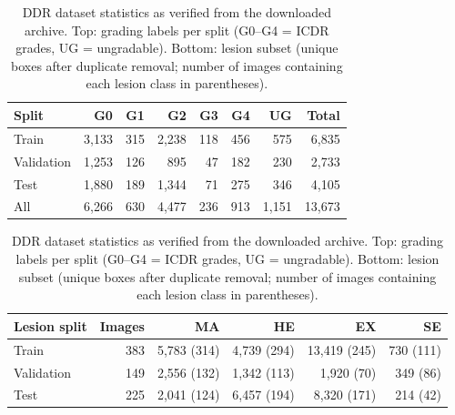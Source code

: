 \begin{table}[!htbp]
\centering
\caption{DDR dataset statistics as verified from the downloaded archive. Top: grading labels per split (G0--G4 = ICDR grades, UG = ungradable). Bottom: lesion subset (unique boxes after duplicate removal; number of images containing each lesion class in parentheses).}
\label{tab:ddr}
\small
\begin{tabular}{@{}lrrrrrrr@{}}
\toprule
Split & G0 & G1 & G2 & G3 & G4 & UG & Total \\
\midrule
Train & 3{,}133 & 315 & 2{,}238 & 118 & 456 & 575 & 6{,}835 \\
Validation & 1{,}253 & 126 & 895 & 47 & 182 & 230 & 2{,}733 \\
Test & 1{,}880 & 189 & 1{,}344 & 71 & 275 & 346 & 4{,}105 \\
\midrule
All & 6{,}266 & 630 & 4{,}477 & 236 & 913 & 1{,}151 & 13{,}673 \\
\bottomrule
\end{tabular}

\vspace{4pt}

\begin{tabular}{@{}lrrrrr@{}}
\toprule
Lesion split & Images & MA & HE & EX & SE \\
\midrule
Train & 383 & 5{,}783 (314) & 4{,}739 (294) & 13{,}419 (245) & 730 (111) \\
Validation & 149 & 2{,}556 (132) & 1{,}342 (113) & 1{,}920 (70) & 349 (86) \\
Test & 225 & 2{,}041 (124) & 6{,}457 (194) & 8{,}320 (171) & 214 (42) \\
\bottomrule
\end{tabular}
\end{table}

